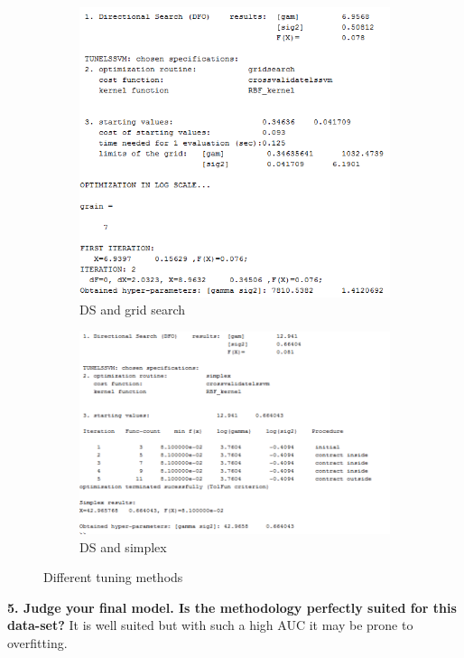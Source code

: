 \documentclass[11pt,oneside,a4paper]{article}
\begin{document}
\begin{figure}[H]
\begin{subfigure}[b]{0.4\textwidth}
		\includegraphics[width=\textwidth]{../Figures/ripley_DS_grid}
		\caption{DS and grid search}
	\end{subfigure}
	\begin{subfigure}[b]{0.4\textwidth}
		\includegraphics[width=\textwidth]{../Figures/ripley_DS_simp}
		\caption{DS and simplex}
	\end{subfigure}
	\caption{Different tuning methods}
	
\end{figure}

\textbf{5. Judge your final model. Is the methodology perfectly suited for this data-set?}
It is well suited but with such a high AUC it may be prone to overfitting.
\end{document}
